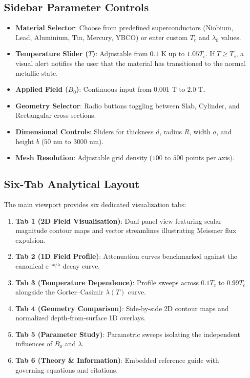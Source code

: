 \documentclass[11pt,a4paper]{article}
\begin{document}
\subsection{Sidebar Parameter Controls}
\begin{itemize}
    \item \textbf{Material Selector}: Choose from predefined superconductors (Niobium, Lead, Aluminium, Tin, Mercury, YBCO) or enter custom $T_c$ and $\lambda_0$ values.
    \item \textbf{Temperature Slider ($T$)}: Adjustable from $0.1\text{ K}$ up to $1.05 T_c$. If $T \ge T_c$, a visual alert notifies the user that the material has transitioned to the normal metallic state.
    \item \textbf{Applied Field ($B_0$)}: Continuous input from $0.001\text{ T}$ to $2.0\text{ T}$.
    \item \textbf{Geometry Selector}: Radio buttons toggling between Slab, Cylinder, and Rectangular cross-sections.
    \item \textbf{Dimensional Controls}: Sliders for thickness $d$, radius $R$, width $a$, and height $b$ ($50\text{ nm}$ to $3000\text{ nm}$).
    \item \textbf{Mesh Resolution}: Adjustable grid density ($100$ to $500$ points per axis).
\end{itemize}

\subsection{Six-Tab Analytical Layout}
The main viewport provides six dedicated visualization tabs:
\begin{enumerate}
    \item \textbf{Tab 1 (2D Field Visualisation)}: Dual-panel view featuring scalar magnitude contour maps and vector streamlines illustrating Meissner flux expulsion.
    \item \textbf{Tab 2 (1D Field Profile)}: Attenuation curves benchmarked against the canonical $\mathrm{e}^{-x/\lambda}$ decay curve.
    \item \textbf{Tab 3 (Temperature Dependence)}: Profile sweeps across $0.1 T_c$ to $0.99 T_c$ alongside the Gorter--Casimir $\lambda(T)$ curve.
    \item \textbf{Tab 4 (Geometry Comparison)}: Side-by-side 2D contour maps and normalized depth-from-surface 1D overlays.
    \item \textbf{Tab 5 (Parameter Study)}: Parametric sweeps isolating the independent influences of $B_0$ and $\lambda$.
    \item \textbf{Tab 6 (Theory \& Information)}: Embedded reference guide with governing equations and citations.
\end{enumerate}
\end{document}
